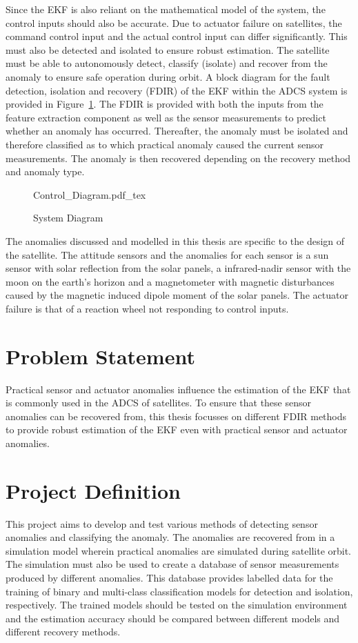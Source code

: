 Since the EKF is also reliant on the mathematical model of the system, the control inputs should also be accurate. Due to actuator failure on satellites, the command control input and the actual control input can differ significantly. This must also be detected and isolated to ensure robust estimation. The satellite must be able to autonomously detect, classify (isolate) and recover from the anomaly to ensure safe operation during orbit. A block diagram for the fault detection, isolation and recovery (FDIR) of the EKF within the ADCS system is provided in Figure~\ref{fig:System_Diagram}. The FDIR is provided with both the inputs from the feature extraction component as well as the sensor measurements to predict whether an anomaly has occurred. Thereafter, the anomaly must be isolated and therefore classified as to which practical anomaly caused the current sensor measurements. The anomaly is then recovered depending on the recovery method and anomaly type.

\begin{figure}[h!b!t]
	\centering
	\def\svgwidth{14cm}
	{Control_Diagram.pdf_tex}
	\caption{System Diagram}
	\label{fig:System_Diagram}
\end{figure}

The anomalies discussed and modelled in this thesis are specific to the design of the satellite. The attitude sensors and the anomalies for each sensor is a sun sensor with solar reflection from the solar panels, a infrared-nadir sensor with the moon on the earth's horizon and a magnetometer with magnetic disturbances caused by the magnetic induced dipole moment of the solar panels. The actuator failure is that of a reaction wheel not responding to control inputs. 

\section{Problem Statement}
Practical sensor and actuator anomalies influence the estimation of the EKF that is commonly used in the ADCS of satellites. To ensure that these sensor anomalies can be recovered from, this thesis focusses on different FDIR methods to provide robust estimation of the EKF even with practical sensor and actuator anomalies.

\section{Project Definition}
This project aims to develop and test various methods of detecting sensor anomalies and classifying the anomaly. The anomalies are recovered from in a simulation model wherein practical anomalies are simulated during satellite orbit. The simulation must also be used to create a database of sensor measurements produced by different anomalies. This database provides labelled data for the training of binary and multi-class classification models for detection and isolation, respectively. The trained models should be tested on the simulation environment and the estimation accuracy should be compared between different models and different recovery methods.

